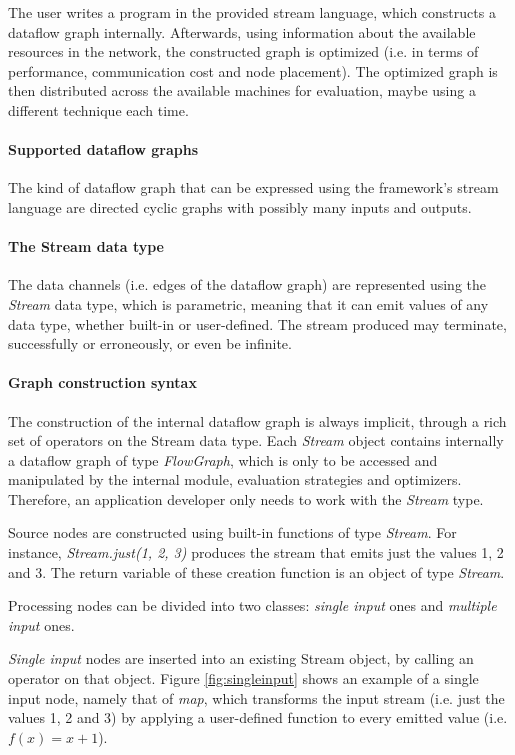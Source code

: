 \documentclass[sigplan,review,anonymous]{acmart}
\begin{document}
The user writes a program in the provided stream language, which constructs a
dataflow graph internally. Afterwards, using information about the available
resources in the network, the constructed graph is optimized (i.e. in terms of
performance, communication cost and node placement). The optimized graph is then
distributed across the available machines for evaluation, maybe using a
different technique each time.

\paragraph{Supported dataflow graphs}
The kind of dataflow graph that can be expressed using the framework's stream
language are directed cyclic graphs with possibly many inputs and outputs.

\paragraph{The Stream data type}
The data channels (i.e. edges of the dataflow graph) are represented using the
\textit{Stream} data type, which is parametric, meaning that it can emit values
of any data type, whether built-in or user-defined. The stream produced may
terminate, successfully or erroneously, or even be infinite.

\paragraph{Graph construction syntax}
The construction of the internal dataflow graph is always implicit, through a
rich set of operators on the Stream data type. Each \textit{Stream} object
contains internally a dataflow graph of type \textit{FlowGraph}, which is only
to be accessed and manipulated by the internal module, evaluation strategies and
optimizers. Therefore, an application developer only needs to work with the
\textit{Stream} type.

Source nodes are constructed using built-in functions of type \textit{Stream}.
For instance, \textit{Stream.just(1, 2, 3)} produces the stream that emits just
the values 1, 2 and 3. The return variable of these creation function is an
object of type \textit{Stream}.

Processing nodes can be divided into two classes: \textit{single input} ones and
\textit{multiple input} ones.

\textit{Single input} nodes are inserted into an existing Stream object, by
calling an operator on that object. Figure \ref{fig:singleinput} shows an
example of a single input node, namely that of \textit{map}, which transforms
the input stream (i.e. just the values 1, 2 and 3) by applying a user-defined
function to every emitted value (i.e. $f(x)=x+1$).
\end{document}
